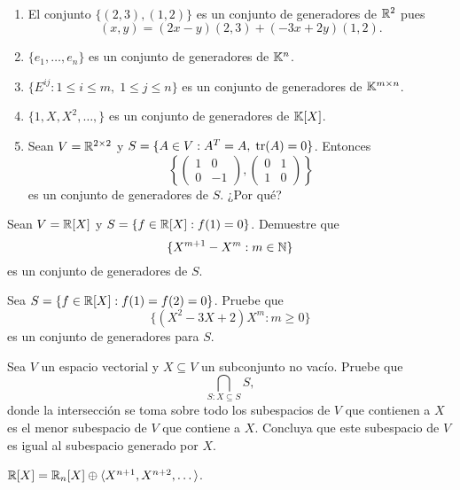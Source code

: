 \begin{examples}\
	\label{exa:generadores}
	\begin{enumerate}
		\item El conjunto $\{(2,3),(1,2)\}$ es un conjunto de generadores de
			$\mathbb{R}^2$ pues 
			\[
				(x,y)=(2x-y)(2,3)+(-3x+2y)(1,2).
			\]
		\item $\{e_1,\dots,e_n\}$ es un conjunto de generadores de $\mathbb{K}^n$.
		\item $\{E^{ij}:1\leq i\leq m,\;1\leq j\leq n\}$ es un conjunto de
			generadores de $\mathbb{K}^{m\times n}$.
		\item $\{1,X,X^2,\dots,\}$ es un conjunto de generadores de $\mathbb{K}[X]$.
		\item Sean $V=\mathbb{R}^{2\times 2}$ y $S=\{A\in V:A^T=A,\;\operatorname{tr}(A)=0\}$.
			Entonces 
			\[
			\left\{\begin{pmatrix}
				1 & 0\\
				0 & -1
			\end{pmatrix},
			\begin{pmatrix}
				0 & 1\\
				1 & 0
			\end{pmatrix}\right\}
			\]
			es un conjunto de generadores de $S$. ¿Por qué?
	\end{enumerate}
\end{examples}

\begin{xca}
	\label{xca:f(1)=0}
	Sean $V=\mathbb{R}[X]$ y $S=\{f\in\mathbb{R}[X]:f(1)=0\}$. Demuestre que 
	\[
	\{X^{m+1}-X^m:m\in\mathbb{N}\}
	\]
	es un conjunto de generadores de $S$.
\end{xca}

\begin{xca}
	\label{xca:X^2-3X+2|f}
	Sea $S=\{f\in\mathbb{R}[X]:f(1)=f(2)=0\}$. Pruebe que 
	\[
		\{(X^2-3X+2)X^m:m\geq 0\}
	\]
	es un conjunto de generadores para $S$.
\end{xca}

\begin{xca}
	Sea $V$ un espacio vectorial y $X\subseteq V$ un subconjunto no vacío.
	Pruebe que
	\[
	\bigcap_{S:X\subseteq S}S,
	\]
	donde la intersección se toma sobre todo los subespacios de $V$ que
	contienen a $X$ es el menor subespacio de $V$ que contiene a $X$. Concluya
	que este subespacio de $V$ es igual al subespacio generado por $X$.
\end{xca}

\begin{example}
	$\mathbb{R}[X]=\mathbb{R}_n[X]\oplus \langle X^{n+1},X^{n+2},\dots\rangle$.
\end{example}

